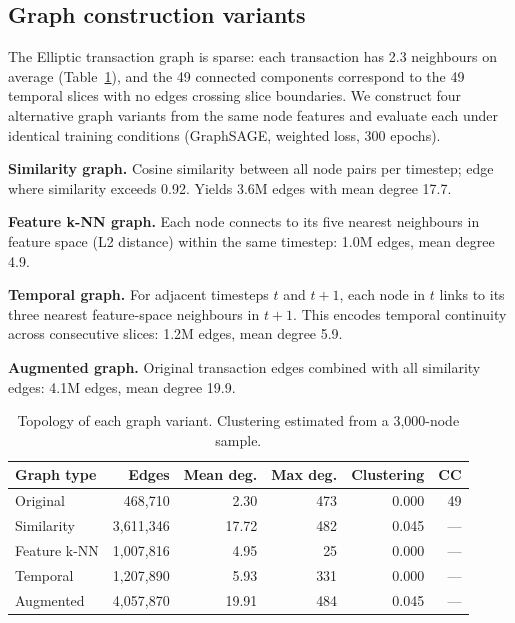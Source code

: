 \subsection{Graph construction variants}
\label{sec:graph_construction}

The Elliptic transaction graph is sparse: each transaction has 2.3
neighbours on average (Table~\ref{tab:graph_stats}), and the 49
connected components correspond to the 49 temporal slices with no
edges crossing slice boundaries.  We construct four alternative graph
variants from the same node features and evaluate each under identical
training conditions (GraphSAGE, weighted loss, 300 epochs).

\textbf{Similarity graph.}  Cosine similarity between all node pairs
per timestep; edge where similarity exceeds 0.92.  Yields 3.6M edges
with mean degree 17.7.

\textbf{Feature k-NN graph.}  Each node connects to its five nearest
neighbours in feature space (L2 distance) within the same timestep:
1.0M edges, mean degree 4.9.

\textbf{Temporal graph.}  For adjacent timesteps $t$ and $t{+}1$, each
node in $t$ links to its three nearest feature-space neighbours in
$t{+}1$.  This encodes temporal continuity across consecutive slices:
1.2M edges, mean degree 5.9.

\textbf{Augmented graph.}  Original transaction edges combined with all
similarity edges: 4.1M edges, mean degree 19.9.

\begin{table}[!htbp]
\centering
\caption{Topology of each graph variant.  Clustering estimated from
a 3,000-node sample.}
\label{tab:graph_stats}
\small
\begin{tabular}{lrrrrr}
\toprule
\textbf{Graph type} & \textbf{Edges} & \textbf{Mean deg.}
  & \textbf{Max deg.} & \textbf{Clustering} & \textbf{CC} \\
\midrule
Original    &    468,710 &  2.30 & 473 & 0.000 & 49 \\
Similarity  &  3,611,346 & 17.72 & 482 & 0.045 & ---\\
Feature k-NN & 1,007,816 &  4.95 &  25 & 0.000 & ---\\
Temporal    &  1,207,890 &  5.93 & 331 & 0.000 & ---\\
Augmented   &  4,057,870 & 19.91 & 484 & 0.045 & ---\\
\bottomrule
\end{tabular}
\end{table}


